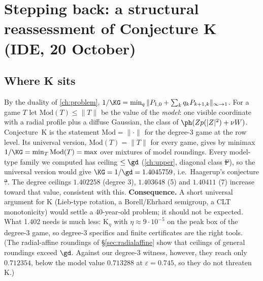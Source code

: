 \section{Stepping back: a structural reassessment of Conjecture K (IDE, 20 October)}\label{ch:forest}

\subsection{Where K sits}
By the duality of \autoref{ch:problem}, $1/\KG=\min_q\|P_{1,0}+\sum_kq_kP_{k+1,k}\|_{\infty\to1}$. For a game $T$ let $\mathrm{Mod}(T)\le\|T\|$ be the value of the \emph{model}: one visible
coordinate with a radial profile plus a diffuse Gaussian, the class of $\ph(Zp(|Z|^2)+\nu W)$. Conjecture~K is the statement $\mathrm{Mod}=\|\cdot\|$ for the degree-3 game at the row
level. Its universal version, $\mathrm{Mod}(T)=\|T\|$ for every game, gives by minimax $1/\KG=\min_T\mathrm{Mod}(T)=\max$ over mixtures of model roundings. Every model-type family we
computed has ceiling $\le\gd$ (\autoref{ch:upper}, diagonal class \st{F}), so the universal version would give $\KG=1/\gd=1.4045759$, i.e.\ Haagerup's conjecture \st{?}. The degree
ceilings $1.402258$ (degree 3), $1.403648$ (5) and $1.40411$ (7) increase toward that value, consistent with this.
\textbf{Consequence.} A short universal argument for K (Lieb-type rotation, a Borell/Ehrhard semigroup, a CLT monotonicity) would settle a 40-year-old problem; it should not be expected.
What 1.402 needs is much less: K$_\eta$ with $\eta\approx9\cdot10^{-5}$ on the peak box of the degree-3 game, so degree-3 specifics and finite certificates are the right tools. (The
radial-affine roundings of \S\ref{sec:radialaffine} show that ceilings of general roundings exceed $\gd$. Against our degree-3 witness, however, they reach only $0.712354$, below the
model value $0.713288$ at $\varepsilon=0.745$, so they do not threaten K.)


